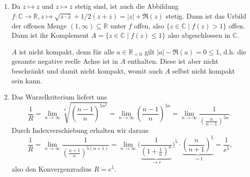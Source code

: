 \documentclass[a4paper]{article}
\begin{document}
\subsection{}

\begin{enumerate}
	\item Da $z \mapsto z$ und $z \mapsto \overline{z}$ stetig sind, ist auch die Abbildung $f: \mathds{C} \to \mathds{R}, z \mapsto \sqrt{z \cdot \overline{z}} + 1/2 (z + \overline{z}) = |z| + \Re(z)$ stetig. Dann ist das Urbild der offenen Menge $(1, \infty) \subseteq \mathds{R}$ unter $f$ offen, also $\{z \in \mathds{C} \mid f(z) > 1\}$ offen. Dann ist ihr Komplement $A = \{z \in \mathds{C} \mid f(z) \leq 1\}$ also abgeschlossen in $\mathds{C}$.
	
	$A$ ist nicht kompakt, denn für alle $a \in \mathds{R}_{<0}$ gilt $|a| - \Re(a) = 0 \leq 1$, d.h. die gesamte negative reelle Achse ist in $A$ enthalten. Diese ist aber nicht beschränkt und damit nicht kompakt, womit auch $A$ selbst nicht kompakt sein kann.
	\item Das Wurzelkriterium liefert uns
	\begin{equation*}
	\frac{1}{R} = \lim_{n \to \infty} \sqrt[n]{\left(\frac{n-1}{n}\right)^{5n^2}} = \lim_{n \to \infty} \left(\frac{n-1}{n}\right)^{5n} = \lim_{n \to \infty} \frac{1}{\left(\frac{n}{n-1}\right)^{5n}}\text{.}
	\end{equation*}
	Durch Indexverschiebung erhalten wir daraus
	\begin{equation*}
		\frac{1}{R} = \lim_{n \to \infty} \frac{1}{\left(\frac{n+1}{n}\right)^{5(n+1)}} =  \lim_{n \to \infty} \Bigg( \frac{1}{ \underbrace{\left( 1 + \frac{1}{n} \right)^n }_{\to e} } \Bigg)^5 \cdot \underbrace{\left(\frac{n}{n+1}\right)^5}_{\to 1} = \frac{1}{e^5}\text{,}
	\end{equation*}
	also den Konvergenzradius $R = e^5$.
\end{enumerate}
\end{document}
